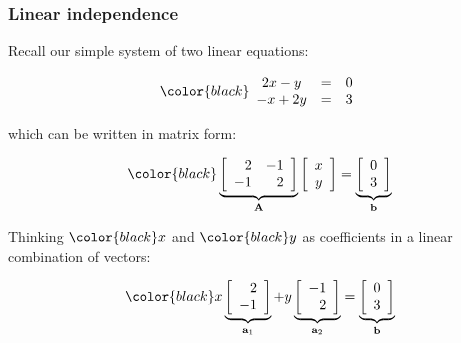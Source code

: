 \documentclass[compress]{beamer}
\newcommand{\black}[1]{{\color{black}#1}}
\newcommand{\beq}[1]{\[\black{#1}\]}
\begin{document}

\begin{frame}
\frametitle{Linear independence}

Recall our simple system of two linear equations:


\beq{
\begin{array}{ccc}
2x - y & = & 0\\
-x + 2y& = &3
\end{array}
}

which can be written in matrix form:

\beq{
\underbrace{\left[
\begin{array}{rr}
2 & -1\\
-1 & 2\\
\end{array}
\right]}_{\A}
\left[
\begin{array}{c}
x\\ 
y
\end{array}
\right] = \underbrace{\left[
\begin{array}{c}
0\\ 
3
\end{array}
\right]}_{\b}
}

Thinking $\black{x}$ and $\black{y}$ as coefficients in a linear combination of vectors:

\beq{
x\underbrace{\left[
\begin{array}{r}
2\\
-1
\end{array}
\right]}_{\a_1}+y
\underbrace{\left[
\begin{array}{r}
-1\\
2
\end{array}
\right]}_{\a_2} = \underbrace{\left[
\begin{array}{c}
0\\ 
3
\end{array}
\right]}_{\b}
}

\end{frame}


\end{document}
